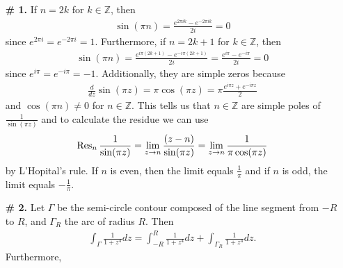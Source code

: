 \documentclass[a4paper,12pt]{article} %
\theoremstyle{plain}
\theoremstyle{definition}
\newcommand{\Z}{\mathbb{Z}}
\begin{document}
\begin{enumerate}
\item[\textbf{\# 1.}]
  If $n = 2k$ for $k \in \Z$, then
  \begin{align*}
    \sin(\pi n) = \frac{e^{2 \pi i k} - e^{-2 \pi i k}}{2i} = 0
  \end{align*}
  since $e^{2 \pi i} = e^{-2 \pi i} = 1$.  Furthermore, if $n = 2k+1$ for $k \in \Z$, then
  \begin{align*}
    \sin(\pi n) = \frac{e^{i \pi (2k+1)} - e^{-i \pi(2k+1)}}{2i} = \frac{e^{i \pi}- e^{-i \pi}}{2i} = 0
  \end{align*} 
  since $e^{i \pi} = e^{-i \pi} = -1$.  Additionally, they are simple zeros because 
  \begin{align*}
    \frac{d}{dz}\sin(\pi z) = \pi \cos(\pi z) =\pi \frac{e^{i \pi z} + e^{-i \pi z}}{2}
  \end{align*}
  and $\cos(\pi n) \neq 0$ for $n \in \Z$.  This tells us that $n \in \Z$ are simple poles of $\frac{1}{\sin(\pi z)}$ and to calculate the residue we can use 
  \begin{align*}
    \Res_n \frac{1}{\sin(\pi z)} = \lim_{z \to n} \frac{(z-n)}{\sin(\pi z)} = \lim_{z \to n} \frac{1}{\pi \cos(\pi z)}
  \end{align*}
  by L'Hopital's rule.  If $n$ is even, then the limit equals $\frac{1}{\pi}$ and if $n$ is odd, the limit equals $-\frac{1}{\pi}$.
\item[\textbf{\# 2.}]
  Let $\Gamma$ be the semi-circle contour composed of the line segment from  $-R$ to $R$, and $\Gamma_R$ the arc of radius $R$.  Then
  \begin{align*}
    \int_{\Gamma} \frac{1}{1 + z^{4}} dz = \int_{-R}^{R} \frac{1}{1 + z^{4}} dz + \int_{\Gamma_R} \frac{1}{1+z^{4}} dz.
  \end{align*}
  Furthermore, 

\end{enumerate}
\end{document}
